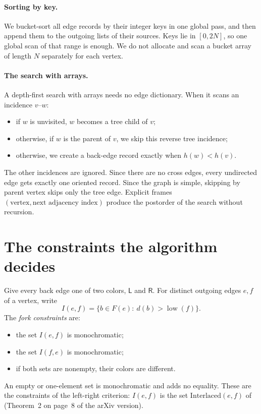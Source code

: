 \documentclass[11pt]{article}
\DeclareMathOperator{\low}{low}
\newcommand{\cL}{\mathsf{L}}
\newcommand{\cR}{\mathsf{R}}
\begin{document}
\paragraph{Sorting by key.}
We bucket-sort all edge records by their integer keys in one global pass, and
then append them to the outgoing lists of their sources. Keys lie in $[0,2N]$,
so one global scan of that range is enough. We do not allocate and scan a
bucket array of length $N$ separately for each vertex.

\paragraph{The search with arrays.}
A depth-first search with arrays needs no edge dictionary. When it scans an
incidence $v$--$w$:
\begin{itemize}[nosep]
\item if $w$ is unvisited, $w$ becomes a tree child of $v$;
\item otherwise, if $w$ is the parent of $v$, we skip this reverse tree
incidence;
\item otherwise, we create a back-edge record exactly when $h(w)<h(v)$.
\end{itemize}
The other incidences are ignored. Since there are no cross edges, every
undirected edge gets exactly one oriented record. Since the graph is simple,
skipping by parent vertex skips only the tree edge. Explicit frames
$(\text{vertex},\text{next adjacency index})$ produce the postorder of the
search without recursion.

\section{The constraints the algorithm decides}

Give every back edge one of two colors, $\cL$ and $\cR$. For distinct outgoing
edges $e,f$ of a vertex, write
\begin{equation*}
I(e,f)=\{b\in F(e):\ d(b)>\low(f)\}.
\end{equation*}
The \emph{fork constraints} are:
\begin{itemize}[nosep]
\item the set $I(e,f)$ is monochromatic;
\item the set $I(f,e)$ is monochromatic;
\item if both sets are nonempty, their colors are different.
\end{itemize}
An empty or one-element set is monochromatic and adds no equality. These are
the constraints of the left-right criterion: $I(e,f)$ is the set
$\mathrm{Interlaced}(e,f)$ of \cite{dFOMR06} (Theorem~2 on page~8 of the arXiv
version).
\end{document}

